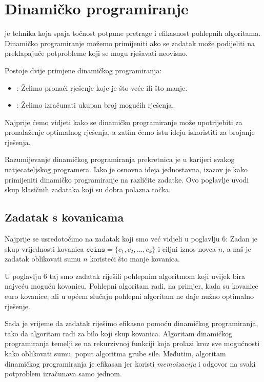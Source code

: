 \chapter{Dinamičko programiranje}


je tehnika koja spaja točnost
potpune pretrage i efikasnost
pohlepnih algoritama.
Dinamičko programiranje možemo primijeniti ako se
zadatak može podijeliti na preklapajuće potprobleme
koji se mogu rješavati neovisno.

Postoje dvije primjene dinamičkog programiranja:

\begin{itemize}
\item
{}:
Želimo pronaći rješenje koje je
što veće ili što manje.
\item
{}:
Želimo izračunati ukupan broj
mogućih rješenja.
\end{itemize}

Najprije ćemo vidjeti kako se dinamičko programiranje
može upotrijebiti za pronalaženje optimalnog rješenja,
a zatim ćemo istu ideju iskoristiti za
brojanje rješenja.

Razumijevanje dinamičkog programiranja prekretnica je
u karijeri svakog natjecateljskog programera.
Iako je osnovna ideja jednostavna,
izazov je kako primijeniti
dinamičko programiranje na različite zadatke.
Ovo poglavlje uvodi skup klasičnih zadataka
koji su dobra polazna točka.

\section{Zadatak s kovanicama}

Najprije se usredotočimo na zadatak koji smo
već vidjeli u poglavlju 6:
Zadan je skup vrijednosti kovanica $\texttt{coins} = \{c_1,c_2,\ldots,c_k\}$
i ciljni iznos novca $n$, a naš je zadatak
oblikovati sumu $n$ koristeći što manje kovanica.

U poglavlju 6 taj smo zadatak riješili
pohlepnim algoritmom koji uvijek bira najveću
moguću kovanicu.
Pohlepni algoritam radi, na primjer,
kada su kovanice euro kovanice,
ali u općem slučaju pohlepni algoritam
ne daje nužno optimalno rješenje.

Sada je vrijeme da zadatak riješimo efikasno
pomoću dinamičkog programiranja, tako da algoritam
radi za bilo koji skup kovanica.
Algoritam dinamičkog programiranja
temelji se na rekurzivnoj funkciji
koja prolazi kroz sve mogućnosti kako
oblikovati sumu, poput algoritma grube sile.
Međutim, algoritam dinamičkog programiranja
je efikasan jer
koristi \emph{memoizaciju} i
odgovor na svaki potproblem izračunava samo jednom.

